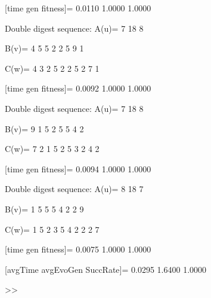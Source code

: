 [time gen fitness]=
    0.0110    1.0000    1.0000

Double digest sequence:
A(u)=
     7    18     8

B(v)=
     4     5     5     2     2     5     9     1

C(w)=
     4     3     2     5     2     2     5     2     7     1

[time gen fitness]=
    0.0092    1.0000    1.0000

Double digest sequence:
A(u)=
     7    18     8

B(v)=
     9     1     5     2     5     5     4     2

C(w)=
     7     2     1     5     2     5     3     2     4     2

[time gen fitness]=
    0.0094    1.0000    1.0000

Double digest sequence:
A(u)=
     8    18     7

B(v)=
     1     5     5     5     4     2     2     9

C(w)=
     1     5     2     3     5     4     2     2     2     7

[time gen fitness]=
    0.0075    1.0000    1.0000

[avgTime  avgEvoGen  SuccRate]=
    0.0295    1.6400    1.0000

>> 